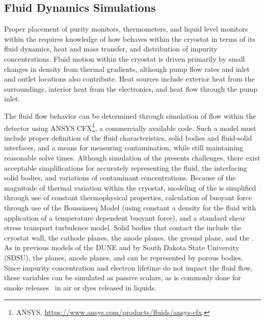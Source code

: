 

\subsection{Fluid Dynamics Simulations}
\label{sec:fdgen-slow-cryo-cfd}

Proper placement of purity monitors, thermometers, and liquid level monitors within the  requires knowledge of how  behaves within the cryostat in terms of its fluid dynamics, heat and mass transfer, and distribution of impurity concentrations. 
Fluid motion within the cryostat is driven primarily by small changes in density from thermal gradients, although pump flow rates and inlet and outlet locations also contribute. 
Heat sources include exterior heat from the surroundings, interior heat from the electronics, and heat flow through the pump inlet.

The fluid flow behavior can be determined through simulation of  flow within the detector using ANSYS CFX\footnote{ANSYS\texttrademark{}, \url{https://www.ansys.com/products/fluids/ansys-cfx}.}, a commercially available  code. Such a model must include proper definition of the fluid characteristics, solid bodies and fluid-solid interfaces, and a means for measuring contamination, while still maintaining reasonable solve times.
Although simulation of the  presents challenges, there exist acceptable simplifications for accurately representing the fluid, the interfacing solid bodies, and variations of contaminant concentrations. Because of the magnitude of thermal variation within the cryostat, modeling of the  is simplified through use of constant thermophysical properties, calculation of buoyant force through use of the Boussinesq Model (using constant a density for the fluid with application of a temperature dependent buoyant force), and a standard shear stress transport turbulence model. Solid bodies that contact the  include the cryostat wall, the cathode planes, the anode planes, the ground plane, and the . As in previous  models of the DUNE  and  by South Dakota State University (SDSU)\cite{docdb-5915}, the  planes, anode planes, and  can be represented by porous bodies. Since impurity concentration and electron lifetime do not impact the fluid flow, these variables can be simulated as  passive scalars, as is commonly done for smoke releases~\cite{cfd-1} in air or dyes released in liquids.

